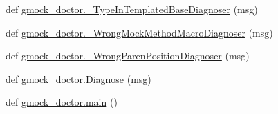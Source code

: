 \begin{DoxyCompactItemize}
\item 
def \mbox{\hyperlink{namespacegmock__doctor_ac4e4908d4e43ef87f522365e99ec36c8}{gmock\+\_\+doctor.\+\_\+\+Type\+In\+Templated\+Base\+Diagnoser}} (msg)
\item 
def \mbox{\hyperlink{namespacegmock__doctor_a430611c0e038abaa33ae320b7118779b}{gmock\+\_\+doctor.\+\_\+\+Wrong\+Mock\+Method\+Macro\+Diagnoser}} (msg)
\item 
def \mbox{\hyperlink{namespacegmock__doctor_a89b0bfee48942a164f7a4e1e923f3a48}{gmock\+\_\+doctor.\+\_\+\+Wrong\+Paren\+Position\+Diagnoser}} (msg)
\item 
def \mbox{\hyperlink{namespacegmock__doctor_a8b791ed6679a0135862ebb3e8c27b2b4}{gmock\+\_\+doctor.\+Diagnose}} (msg)
\item 
def \mbox{\hyperlink{namespacegmock__doctor_a6eb6c47cf5a3a7c4266f473c0af6b82f}{gmock\+\_\+doctor.\+main}} ()
\end{DoxyCompactItemize}
